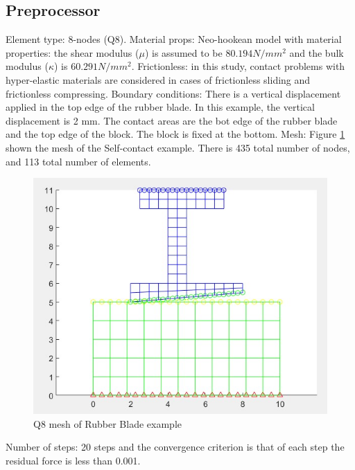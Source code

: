 \subsection{Preprocessor}
Element type: 8-nodes (Q8).
\vspace{0.38cm} \newline
Material props: Neo-hookean model with material properties: the shear modulus ($\mu$) is assumed to 
be $80.194 N/mm^2$ and the bulk modulus ($\kappa$) is $60.291 N/mm^2$.
\vspace{0.38cm} \newline
Frictionless: in this study, contact problems with hyper-elastic materials are
considered in cases of frictionless sliding and frictionless compressing.
\vspace{0.38cm} \newline
Boundary conditions:
There is a vertical displacement applied in the top edge of the rubber blade. 
In this example, the vertical displacement is 2 mm. The contact areas are the bot edge of the rubber blade and the top edge of the block.
The block is fixed at the bottom.
\vspace{0.38cm} \newline
Mesh: Figure \ref{fig:mesh_rub} shown the mesh of the Self-contact example.
There is 435 total number of nodes, and 113 total number of elements.
\begin{figure}[H]
    \centering
    \includegraphics[scale=1]{Figures/mesh_rub.jpg}
    \decoRule
    \caption{Q8 mesh of Rubber Blade example}
    \label{fig:mesh_rub}
\end{figure} \noindent
Number of steps: 20 steps and the convergence criterion is that of each step the residual force is less than 0.001.
\newpage
